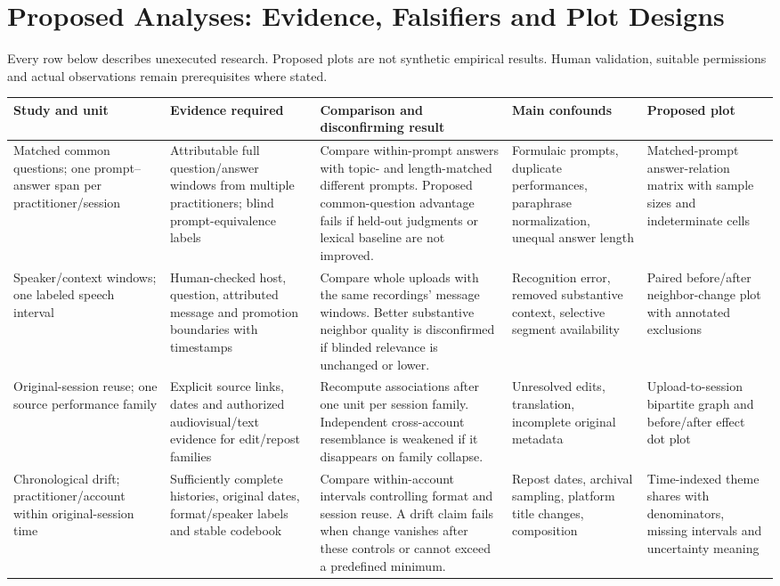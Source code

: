 \section{Proposed Analyses: Evidence, Falsifiers and Plot Designs}
Every row below describes unexecuted research. Proposed plots are not synthetic empirical results. Human validation, suitable permissions and actual observations remain prerequisites where stated.
\begingroup\footnotesize
\setlength{\tabcolsep}{3pt}
\begin{longtable}{p{}p{}p{}p{}p{}}
\toprule Study and unit & Evidence required & Comparison and disconfirming result & Main confounds & Proposed plot \\ \midrule\endhead
Matched common questions; one prompt--answer span per practitioner/session & Attributable full question/answer windows from multiple practitioners; blind prompt-equivalence labels & Compare within-prompt answers with topic- and length-matched different prompts. Proposed common-question advantage fails if held-out judgments or lexical baseline are not improved. & Formulaic prompts, duplicate performances, paraphrase normalization, unequal answer length & Matched-prompt answer-relation matrix with sample sizes and indeterminate cells \\
Speaker/context windows; one labeled speech interval & Human-checked host, question, attributed message and promotion boundaries with timestamps & Compare whole uploads with the same recordings' message windows. Better substantive neighbor quality is disconfirmed if blinded relevance is unchanged or lower. & Recognition error, removed substantive context, selective segment availability & Paired before/after neighbor-change plot with annotated exclusions \\
Original-session reuse; one source performance family & Explicit source links, dates and authorized audiovisual/text evidence for edit/repost families & Recompute associations after one unit per session family. Independent cross-account resemblance is weakened if it disappears on family collapse. & Unresolved edits, translation, incomplete original metadata & Upload-to-session bipartite graph and before/after effect dot plot \\
Chronological drift; practitioner/account within original-session time & Sufficiently complete histories, original dates, format/speaker labels and stable codebook & Compare within-account intervals controlling format and session reuse. A drift claim fails when change vanishes after these controls or cannot exceed a predefined minimum. & Repost dates, archival sampling, platform title changes, composition & Time-indexed theme shares with denominators, missing intervals and uncertainty meaning \\

\end{longtable}
